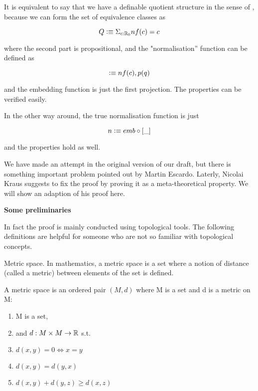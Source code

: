 It is equivalent to say that we have a definable quotient structure in
the sense of \cite{aan}, because we can form the set of equivalence
classes as

\begin{equation*}
Q \vcentcolon\equiv \Sigma_{c : \mathbb{R}_0} nf(c) = c
\end{equation*}

where the second part is propositional, and the "normalisation''
function can be defined as

\begin{equation*}
[c] \defeq nf(c) , p(q)
\end{equation*}

and the embedding function is just the first projection. The properties can be verified
easily.

In the other way around, the true normalisation function is just

\begin{equation*}
n \vcentcolon\equiv emb \circ [\_]
\end{equation*}

and the properties hold as well.


We have made an attempt in the original version of our \cite{aan}
draft, but there is something important problem pointed out by Martin Escardo. Laterly, Nicolai
Kraus suggests to fix the proof by proving it as a meta-theoretical
property. We will show an adaption of his proof here.

\textbf{Some preliminaries}

In fact the proof is mainly conducted using topological tools. The
following definitions are helpful for someone who are not so familiar
with topological concepts.


\begin{definition}
Metric space. In mathematics, a metric space is a set where a notion
of distance (called a metric) between elements of the set is defined.

A metric space is an ordered pair $(M , d)$ where M is a set and d is a metric on M:
\begin{enumerate}
\item M is a set,
\item and $d : M \times M \rightarrow \mathbb{R}$ s.t.
\item $d (x , y) = 0 \iff x = y$
\item $d(x,y)=d(y,x)$
\item $d(x,y)+d(y,z) \ge d(x,z)$ 
\end{enumerate}
\end{definition}

